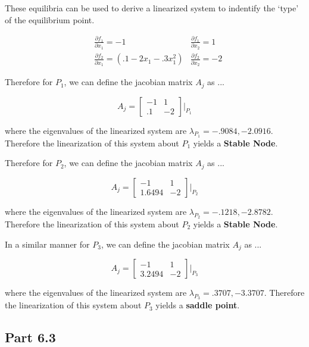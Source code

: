     These equilibria can be used to derive a linearized system to indentify the `type' of the equilibrium point.

    $$
    \begin{matrix}
        & \frac{\partial f_{1}}{\partial x_{1}} = -1 & \frac{\partial f_{1}}{\partial x_{2}} = 1 \\
        & \frac{\partial f_{2}}{\partial x_{1}} = \left( .1 - 2x_{1} -.3x_{1}^2 \right) & \frac{\partial f_{2}}{\partial x_{2}} = -2
    \end{matrix}
    $$

    Therefore for $P_1$, we can define the jacobian matrix $A_j$ as ...

    $$ A_j =
    \begin{bmatrix}
        -1 & 1 \\
        .1 & -2
    \end{bmatrix}\Big|_{P_1}
    $$

    where the eigenvalues of the linearized system are $\lambda_{P_{1}} = -.9084, -2.0916$. Therefore the linearization of this system about $P_1$ yields a \textbf{Stable Node}.


    Therefore for $P_2$, we can define the jacobian matrix $A_j$ as ...

    $$ A_j =
    \begin{bmatrix}
    -1 & 1 \\
    1.6494 & -2
    \end{bmatrix}\Big|_{P_2}
    $$

    where the eigenvalues of the linearized system are $\lambda_{P_{2}} = -.1218, -2.8782$. Therefore the linearization of this system about $P_2$ yields a \textbf{Stable Node}.

    In a similar manner for $P_3$, we can define the jacobian matrix $A_j$ as ...

    $$ A_j =
    \begin{bmatrix}
    -1 & 1 \\
    3.2494 & -2
    \end{bmatrix}\Big|_{P_3}
    $$

    where the eigenvalues of the linearized system are $\lambda_{P_{3}} = .3707, -3.3707 $. Therefore the linearization of this system about $P_3$ yields a \textbf{saddle point}.


    \subsection*{Part 6.3}


